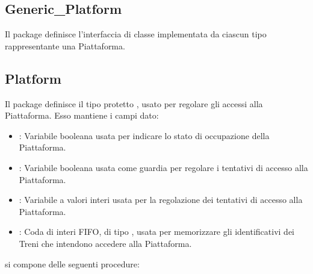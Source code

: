 	\subsection{Generic\_Platform}
	
	Il package  definisce l'interfaccia di classe  implementata da ciascun tipo rappresentante una Piattaforma.
	
	\subsection{Platform} 
	
	Il package  definisce il tipo protetto , usato per regolare gli accessi alla Piattaforma. Esso mantiene i campi dato:
	\begin{itemize}
		\item {}: Variabile booleana usata per indicare lo stato di occupazione della Piattaforma.

		\item {}: Variabile booleana usata come guardia per regolare i tentativi di accesso alla Piattaforma.

		\item {}: Variabile a valori interi usata per la regolazione dei tentativi di accesso alla Piattaforma.
		
		\item {}: Coda di interi FIFO, di tipo , usata per memorizzare gli identificativi dei Treni che intendono accedere alla Piattaforma.
	\end{itemize}
	 si compone delle seguenti procedure:
	
